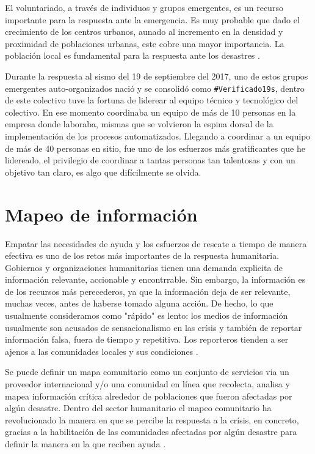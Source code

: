 \documentclass[12pt,spanish,oneside,breaklinks]{book}
\begin{document}
El voluntariado, a través de individuos y grupos emergentes, es un recurso importante para la respuesta ante la emergencia. Es muy probable que dado el crecimiento de los centros urbanos, aunado al incremento en la densidad  y proximidad de poblaciones urbanas, este cobre una mayor importancia. La población local es fundamental para la respuesta ante los desastres \cite{coord}.

Durante la respuesta al sismo del 19 de septiembre del 2017, uno de estos grupos emergentes auto-organizados nació y se consolidó como \texttt{\#Verificado19s}, dentro de este colectivo tuve la fortuna de liderear al equipo técnico y tecnológico del colectivo. En ese momento coordinaba un equipo de más de 10 personas en la empresa donde laboraba, mismas que se volvieron la espina dorsal de la implementación de los procesos automatizados. Llegando a coordinar a un equipo de más de 40 personas en sitio, fue uno de los esfuerzos más gratificantes que he lidereado, el privilegio de coordinar a tantas personas tan talentosas y con un objetivo tan claro, es algo que difícilmente se olvida.

\section{Mapeo de información}
\label{sec:org748f04e}

Empatar las necesidades de ayuda y los esfuerzos de rescate a tiempo de manera efectiva es uno de los retos más importantes de la respuesta humanitaria. Gobiernos y organizaciones humanitarias tienen una demanda explicita de información relevante, accionable y encontrrable. Sin embargo, la información es de los recursos más perecederos\cite{bigdatahum}, ya que la información deja de ser relevante, muchas veces, antes de haberse tomado alguna acción. De hecho, lo que usualmente consideramos como "rápido" es lento: los medios de información usualmente son acusados de sensacionalismo en las crísis y también de reportar información falsa, fuera de tiempo y repetitiva. Los reporteros tienden a ser ajenos a las comunidades locales y sus condiciones \cite{networkshum}.

Se puede definir un mapa comunitario como un conjunto de servicios via un proveedor internacional y/o una comunidad en línea que recolecta, analisa y mapea información crítica alrededor de poblaciones que fueron afectadas por algún desastre. \cite{crowdsourced} Dentro del sector humanitario el mapeo comunitario ha revolucionado la manera en que se percibe la respuesta a la crísis, en concreto, gracias a la habilitación de las comunidades afectadas por algún desastre para definir la manera en la que reciben ayuda \cite{harvardhuman}.
\end{document}
